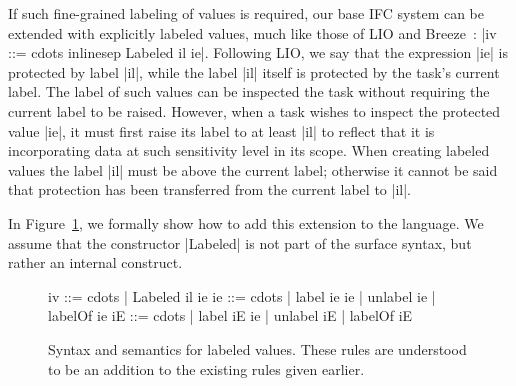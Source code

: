 If such fine-grained labeling of values is required, our base IFC
system can be extended with explicitly labeled
values, much like those of LIO and
Breeze~\cite{lio, Hritcu:2013:YIB:2497621.2498098}: |iv ::= cdots
inlinesep Labeled il ie|.
%
Following LIO, we say that the expression |ie| is protected by label |il|,
while the label |il| itself is protected by the task's current label.
%
%
The label of such values can be inspected the task without
requiring the current label to be raised.
%
However, when a task wishes to inspect the protected value |ie|, it
must first raise its label to at least |il| to reflect that it is
incorporating data at such sensitivity level in its scope.
%
When creating labeled values the label |il| must be above
the current label; otherwise it cannot be said that protection has
been transferred from the current label to |il|.
%

In Figure~\ref{fig:labeled-vals}, we formally show how to add this
extension to the language.
We assume that the constructor |Labeled| is not part
of the surface syntax, but rather an internal construct.

\begin{figure}
  \begin{code}
    iv  ::= cdots | Labeled il ie
    ie  ::= cdots | label ie ie | unlabel ie | labelOf ie
    iE  ::= cdots | label iE ie | unlabel iE | labelOf iE
  \end{code}
  \caption{Syntax and semantics for labeled values.  These rules are
    understood to be an addition to the existing rules given earlier.}
  \label{fig:labeled-vals}
\end{figure}

